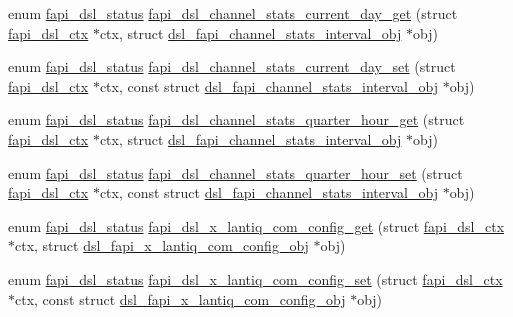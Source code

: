 \begin{DoxyCompactItemize}
\item 
enum \hyperlink{group__FAPI__DSL_ga6a68d961535e6f7aa239751763131a70}{fapi\-\_\-dsl\-\_\-status} \hyperlink{group__FAPI__DSL_ga78c49035d7f7ea738af2b83fae3b3880}{fapi\-\_\-dsl\-\_\-channel\-\_\-stats\-\_\-current\-\_\-day\-\_\-get} (struct \hyperlink{structfapi__dsl__ctx}{fapi\-\_\-dsl\-\_\-ctx} $\ast$ctx, struct \hyperlink{structdsl__fapi__channel__stats__interval__obj}{dsl\-\_\-fapi\-\_\-channel\-\_\-stats\-\_\-interval\-\_\-obj} $\ast$obj)
\item 
enum \hyperlink{group__FAPI__DSL_ga6a68d961535e6f7aa239751763131a70}{fapi\-\_\-dsl\-\_\-status} \hyperlink{group__FAPI__DSL_ga73a901eeec71eba652a8ae0e44060a48}{fapi\-\_\-dsl\-\_\-channel\-\_\-stats\-\_\-current\-\_\-day\-\_\-set} (struct \hyperlink{structfapi__dsl__ctx}{fapi\-\_\-dsl\-\_\-ctx} $\ast$ctx, const struct \hyperlink{structdsl__fapi__channel__stats__interval__obj}{dsl\-\_\-fapi\-\_\-channel\-\_\-stats\-\_\-interval\-\_\-obj} $\ast$obj)
\item 
enum \hyperlink{group__FAPI__DSL_ga6a68d961535e6f7aa239751763131a70}{fapi\-\_\-dsl\-\_\-status} \hyperlink{group__FAPI__DSL_gaadd656408568e4b0075043258431a31d}{fapi\-\_\-dsl\-\_\-channel\-\_\-stats\-\_\-quarter\-\_\-hour\-\_\-get} (struct \hyperlink{structfapi__dsl__ctx}{fapi\-\_\-dsl\-\_\-ctx} $\ast$ctx, struct \hyperlink{structdsl__fapi__channel__stats__interval__obj}{dsl\-\_\-fapi\-\_\-channel\-\_\-stats\-\_\-interval\-\_\-obj} $\ast$obj)
\item 
enum \hyperlink{group__FAPI__DSL_ga6a68d961535e6f7aa239751763131a70}{fapi\-\_\-dsl\-\_\-status} \hyperlink{group__FAPI__DSL_ga3e8c60a91933658b6c1823419f025200}{fapi\-\_\-dsl\-\_\-channel\-\_\-stats\-\_\-quarter\-\_\-hour\-\_\-set} (struct \hyperlink{structfapi__dsl__ctx}{fapi\-\_\-dsl\-\_\-ctx} $\ast$ctx, const struct \hyperlink{structdsl__fapi__channel__stats__interval__obj}{dsl\-\_\-fapi\-\_\-channel\-\_\-stats\-\_\-interval\-\_\-obj} $\ast$obj)
\item 
enum \hyperlink{group__FAPI__DSL_ga6a68d961535e6f7aa239751763131a70}{fapi\-\_\-dsl\-\_\-status} \hyperlink{group__FAPI__DSL_ga796584ea1348650374f19b51d7e53f4b}{fapi\-\_\-dsl\-\_\-x\-\_\-lantiq\-\_\-com\-\_\-config\-\_\-get} (struct \hyperlink{structfapi__dsl__ctx}{fapi\-\_\-dsl\-\_\-ctx} $\ast$ctx, struct \hyperlink{structdsl__fapi__x__lantiq__com__config__obj}{dsl\-\_\-fapi\-\_\-x\-\_\-lantiq\-\_\-com\-\_\-config\-\_\-obj} $\ast$obj)
\item 
enum \hyperlink{group__FAPI__DSL_ga6a68d961535e6f7aa239751763131a70}{fapi\-\_\-dsl\-\_\-status} \hyperlink{group__FAPI__DSL_gac5b57da774a1ecb2bf814c12d22e29a9}{fapi\-\_\-dsl\-\_\-x\-\_\-lantiq\-\_\-com\-\_\-config\-\_\-set} (struct \hyperlink{structfapi__dsl__ctx}{fapi\-\_\-dsl\-\_\-ctx} $\ast$ctx, const struct \hyperlink{structdsl__fapi__x__lantiq__com__config__obj}{dsl\-\_\-fapi\-\_\-x\-\_\-lantiq\-\_\-com\-\_\-config\-\_\-obj} $\ast$obj)
\end{DoxyCompactItemize}


